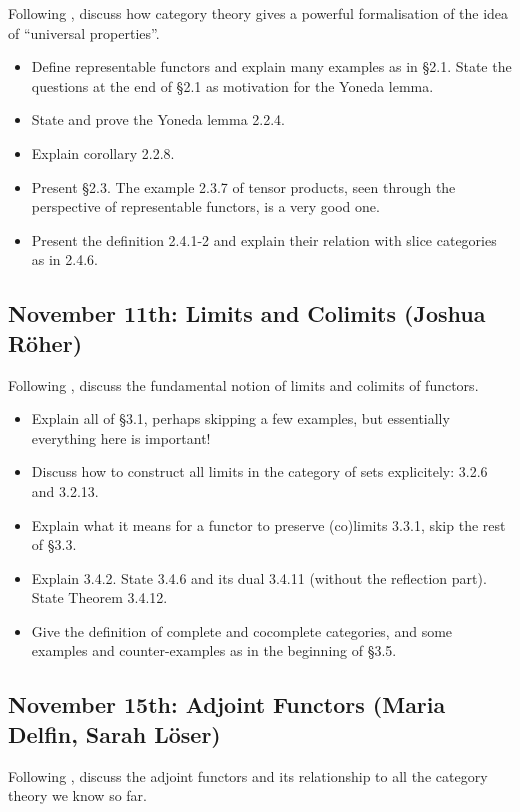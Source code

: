 \documentclass{amsart}
\theoremstyle{definition}
\theoremstyle{remark}
\begin{document}
Following \cite[Chapter 2]{Riehl_context}, discuss how category theory gives a powerful formalisation of the idea of ``universal properties''.

\begin{itemize}
\item Define representable functors and explain many examples as in \S 2.1. State the questions at the end of \S 2.1 as motivation for the Yoneda lemma.
\item State and prove the Yoneda lemma 2.2.4.
\item Explain corollary 2.2.8.
\item Present \S 2.3. The example 2.3.7 of tensor products, seen through the perspective of representable functors, is a very good one.
\item Present the definition 2.4.1-2 and explain their relation with slice categories as in 2.4.6.
\end{itemize}

\subsection{November 11th: Limits and Colimits (Joshua R\"oher)}

Following \cite[Chapter 3]{Riehl_context}, discuss the fundamental notion of limits and colimits of functors.

\begin{itemize}
\item Explain all of \S 3.1, perhaps skipping a few examples, but essentially everything here is important!
\item Discuss how to construct all limits in the category of sets explicitely: 3.2.6 and 3.2.13.
\item Explain what it means for a functor to preserve (co)limits 3.3.1, skip the rest of \S 3.3.
\item Explain 3.4.2. State 3.4.6 and its dual 3.4.11 (without the reflection part). State Theorem 3.4.12.
\item Give the definition of complete and cocomplete categories, and some examples and counter-examples as in the beginning of \S 3.5.
\end{itemize}

\subsection{November 15th: Adjoint Functors (Maria Delfin, Sarah L\"oser)}

Following \cite[Chapter 4]{Riehl_context}, discuss the adjoint functors and its relationship to all the category theory we know so far.
\end{document}
